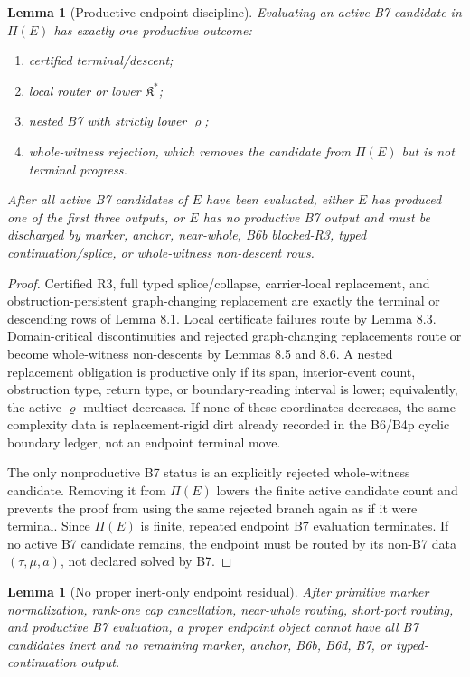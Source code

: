\documentclass[11pt]{amsart}
\newtheorem{lemma}[theorem]{Lemma}
\theoremstyle{definition}
\begin{document}
\begin{lemma}[Productive endpoint discipline]
Evaluating an active B7 candidate in \(\Pi(E)\) has exactly one productive outcome:

\begin{enumerate}
\item certified terminal/descent;
\item local router or lower \(\mathfrak K^\ast\);
\item nested B7 with strictly lower \(\varrho\);
\item whole-witness rejection, which removes the candidate from \(\Pi(E)\) but is not terminal progress.
\end{enumerate}

After all active B7 candidates of \(E\) have been evaluated, either \(E\) has produced one of the first three outputs, or \(E\) has no productive B7 output and must be discharged by marker, anchor, near-whole, B6b blocked-R3, typed continuation/splice, or whole-witness non-descent rows.

\end{lemma}
\begin{proof}
Certified R3, full typed splice/collapse, carrier-local replacement, and obstruction-persistent graph-changing replacement are exactly the terminal or descending rows of Lemma 8.1. Local certificate failures route by Lemma 8.3. Domain-critical discontinuities and rejected graph-changing replacements route or become whole-witness non-descents by Lemmas 8.5 and 8.6. A nested replacement obligation is productive only if its span, interior-event count, obstruction type, return type, or boundary-reading interval is lower; equivalently, the active \(\varrho\) multiset decreases. If none of these coordinates decreases, the same-complexity data is replacement-rigid dirt already recorded in the B6/B4p cyclic boundary ledger, not an endpoint terminal move.

The only nonproductive B7 status is an explicitly rejected whole-witness candidate. Removing it from \(\Pi(E)\) lowers the finite active candidate count and prevents the proof from using the same rejected branch again as if it were terminal. Since \(\Pi(E)\) is finite, repeated endpoint B7 evaluation terminates. If no active B7 candidate remains, the endpoint must be routed by its non-B7 data \((\tau,\mu,a)\), not declared solved by B7.

\end{proof}
\begin{lemma}[No proper inert-only endpoint residual]
After primitive marker normalization, rank-one cap cancellation, near-whole routing, short-port routing, and productive B7 evaluation, a proper endpoint object cannot have all B7 candidates inert and no remaining marker, anchor, B6b, B6d, B7, or typed-continuation output.

\end{lemma}
\end{document}
